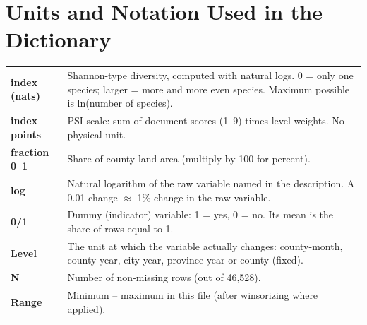 \documentclass[10pt]{article}
\begin{document}
\section{Units and Notation Used in the Dictionary}
\begin{table}[H]\centering\small
\begin{tabularx}{\linewidth}{>{\bfseries}l>{\raggedright\arraybackslash}X}
\toprule
index (nats) & Shannon-type diversity, computed with natural logs. 0 = only one species; larger = more and more even species. Maximum possible is ln(number of species).\\
index points & PSI scale: sum of document scores (1--9) times level weights. No physical unit.\\
fraction 0--1 & Share of county land area (multiply by 100 for percent).\\
log & Natural logarithm of the raw variable named in the description. A 0.01 change $\approx$ 1\% change in the raw variable.\\
0/1 & Dummy (indicator) variable: 1 = yes, 0 = no. Its mean is the share of rows equal to 1.\\
Level & The unit at which the variable actually changes: county-month, county-year, city-year, province-year or county (fixed).\\
N & Number of non-missing rows (out of 46,528).\\
Range & Minimum -- maximum in this file (after winsorizing where applied).\\
\bottomrule
\end{tabularx}
\end{table}
\end{document}
